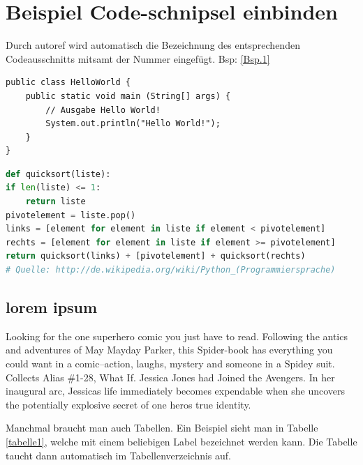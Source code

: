 
\chapter{Beispiel Code-schnipsel einbinden}

Durch autoref wird automatisch die Bezeichnung des entsprechenden Codeausschnitts mitsamt der Nummer eingefügt. Bsp: \autoref{Bsp.1}


\begin{lstlisting}[caption=Code-Beispiel, label=Bsp.1]
public class HelloWorld {
	public static void main (String[] args) {
		// Ausgabe Hello World!
		System.out.println("Hello World!");
	}
}
\end{lstlisting}

\begin{lstlisting}[caption=Python-Code, label=Python-Code, title=Titel des Python-Codes,language=Python]
def quicksort(liste):
if len(liste) <= 1:
	return liste
pivotelement = liste.pop()
links = [element for element in liste if element < pivotelement]
rechts = [element for element in liste if element >= pivotelement]
return quicksort(links) + [pivotelement] + quicksort(rechts)
# Quelle: http://de.wikipedia.org/wiki/Python_(Programmiersprache)
\end{lstlisting}

\section{lorem ipsum}
Looking for the one superhero comic you just have to read. Following the antics and adventures of May Mayday Parker, this Spider-book has everything you could want in a comic--action, laughs, mystery and someone in a Spidey suit. Collects Alias \#1-28, What If. Jessica Jones had Joined the Avengers. In her inaugural arc, Jessicas life immediately becomes expendable when she uncovers the potentially explosive secret of one heros true identity. 

Manchmal braucht man auch Tabellen. Ein Beispiel sieht man in Tabelle \ref{tabelle1}, welche mit einem beliebigen Label bezeichnet werden kann. Die Tabelle taucht dann automatisch im Tabellenverzeichnis auf.


